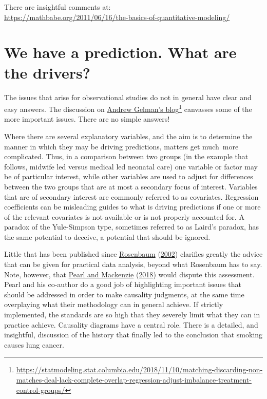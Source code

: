 \documentclass[
  10pt,
  b5paper]{book}
\begin{document}
There are insightful comments at:\\
\url{https://mathbabe.org/2011/06/16/the-basics-of-quantitative-modeling/}

\hypertarget{we-have-a-prediction.-what-are-the-drivers}{%
\section{We have a prediction. What are the drivers?}\label{we-have-a-prediction.-what-are-the-drivers}}

The issues that arise for observational studies do not in general have
clear and easy answers. The discussion on
\href{https://statmodeling.stat.columbia.edu/2018/11/10/matching-discarding-non-matches-deal-lack-complete-overlap-regression-adjust-imbalance-treatment-control-groups/}{Andrew Gelman's blog}\footnote{\url{https://statmodeling.stat.columbia.edu/2018/11/10/matching-discarding-non-matches-deal-lack-complete-overlap-regression-adjust-imbalance-treatment-control-groups/}} canvasses some of the more important issues. There are no simple answers!

Where there are several explanatory variables, and the aim is
to determine the manner in which they may be driving predictions,
matters get much~more complicated. Thus, in a comparison
between two groups (in the example that follows, midwife led
versus medical led neonatal care) one variable or factor may
be of particular interest, while other variables are used to
adjust for differences between the two groups that are at
most a secondary focus of interest. Variables that are of
secondary interest are commonly referred to as covariates.
Regression coefficients can be misleading guides to what is
driving predictions if one or more of the relevant covariates
is not available or is not properly accounted for. A paradox
of the Yule-Simpson type, sometimes referred to as Laird's
paradox, has the same potential to deceive, a potential that
should be ignored.

Little that has been published since \protect\hyperlink{ref-RosBook}{Rosenbaum} (\protect\hyperlink{ref-RosBook}{2002}) clarifies greatly the
advice that can be given for practical data analysis, beyond what
Rosenbaum has to say. Note, however, that \protect\hyperlink{ref-pearl2018book}{Pearl and Mackenzie} (\protect\hyperlink{ref-pearl2018book}{2018}) would
dispute this assessment. Pearl and his co-author do a good job of
highlighting important issues that should be addressed in order to
make causality judgments, at the same time overplaying what their
methodology can in general achieve. If strictly implemented,
the standards are so high that they severely limit what they can
in practice achieve. Causality diagrams have a central role.
There is a detailed, and insightful, discussion of the history
that finally led to the conclusion that smoking causes lung cancer.
\end{document}
